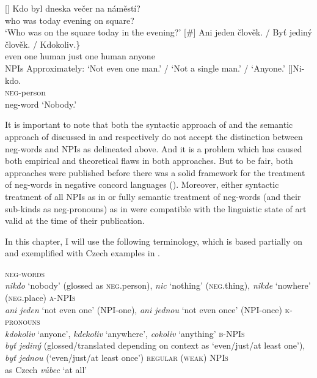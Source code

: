 \documentclass[output=paper,colorlinks,citecolor=brown]{langscibook}
\begin{document}
\ea\label{ex:4-a}
\begin{xlist}
[]{ \gll Kdo byl dneska večer na náměstí?\\
who was today evening on square?\\
\glt `Who was on the square today in the evening?'}
[\#]{ \gll \minsp{\{} Ani jeden člověk. / Byť jediný člověk. / Kdokoliv.\}\\
{} even one human {} just one human {} anyone \\\hfill NPIs %
\glt Approximately: `Not even one man.' / `Not a single man.' / `Anyone.'}
[]{\gll Ni-kdo.\\
\textsc{neg-}person\\\hfill neg-word
\glt `Nobody.'}\label{ex:4-b}
\end{xlist}
\z

\noindent It is important to note that both the syntactic approach of \citet{progovac1994negative} and the semantic approach of \citet{Blaszczak2001} discussed in  and  respectively do not accept the distinction between neg-words and NPIs as delineated above. And it is a problem which has caused both empirical and theoretical flaws in both approaches. But to be fair, both approaches were published before there was a solid framework for the treatment of neg-words in negative concord languages (\citealt{zeijlstra2004sentential}). Moreover, either syntactic treatment of all NPIs as in \citet{Progovac1993a} or fully semantic treatment of neg-words (and their sub-kinds as neg-pronouns) as in \citet{Blaszczak2001} were compatible with the linguistic state of art valid at the time of their publication.

In this chapter, I will use the following terminology, which is based partially on \citet{Blaszczak2001} and exemplified with Czech examples in .


\ea\label{ex:6} \ea \textsc{neg-words}\\ \textit{nikdo} `nobody' (glossed as \textsc{neg}.person), \textit{nic} `nothing' (\textsc{neg}.thing), \textit{nikde} `nowhere' (\textsc{neg}.place)
\ex \textsc{a-NPIs}\\ \textit{ani jeden} `not even one' (NPI-one), \textit{ani jednou} `not even once' (NPI-once) 
\ex \textsc{k-pronouns} \\ \textit{kdokoliv} `anyone', \textit{kdekoliv} `anywhere', \textit{cokoliv} `anything' 
\ex \textsc{b-NPIs} \\ \textit{byť jediný} (glossed/translated depending on context as `even/just/at least one'), \textit{byť jednou} (`even/just/at least once') \hfill 
\ex \textsc{regular (weak) NPIs} \\ as Czech \textit{vůbec} `at all'
\z
\z
\end{document}
